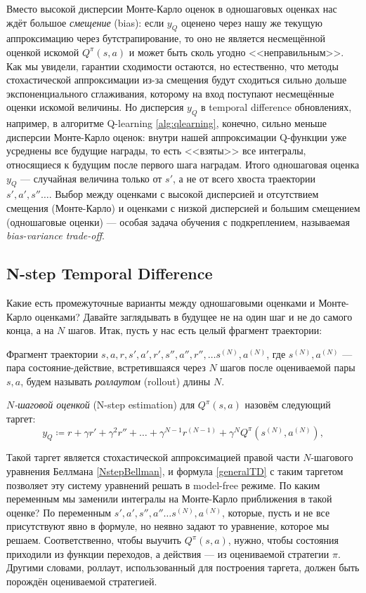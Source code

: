 Вместо высокой дисперсии Монте-Карло оценок в одношаговых оценках нас ждёт большое \emph{смещение} (bias): если $y_Q$ оценено через нашу же текущую аппроксимацию через бутстрапирование, то оно не является несмещённой оценкой искомой $Q^{\pi}(s, a)$ и может быть сколь угодно <<неправильным>>. Как мы увидели, гарантии сходимости остаются, но естественно, что методы стохастической аппроксимации из-за смещения будут сходиться сильно дольше экспоненциального сглаживания, которому на вход поступают несмещённые оценки искомой величины. Но дисперсия $y_Q$ в temporal difference обновлениях, например, в алгоритме Q-learning \ref{alg:qlearning}, конечно, сильно меньше дисперсии Монте-Карло оценок: внутри нашей аппроксимации Q-функции уже усреднены все будущие награды, то есть <<взяты>> все интегралы, относящиеся к будущим после первого шага наградам. Итого одношаговая оценка $y_Q$ --- случайная величина только от $s'$, а не от всего хвоста траектории $s', a', s'' \dots$. Выбор между оценками с высокой дисперсией и отсутствием смещения (Монте-Карло) и оценками с низкой дисперсией и большим смещением (одношаговые оценки) --- особая задача обучения с подкреплением, называемая \emph{bias-variance trade-off}.

\subsection{N-step Temporal Difference}

Какие есть промежуточные варианты между одношаговыми оценками и Монте-Карло оценками? Давайте заглядывать в будущее не на один шаг и не до самого конца, а на $N$ шагов. Итак, пусть у нас есть целый фрагмент траектории:

\begin{definition}
Фрагмент траектории $s, a, r, s', a', r', s'', a'', r'', \dots s^{(N)}, a^{(N)}$, где $s^{(N)}, a^{(N)}$  --- пара состояние-действие, встретившаяся через $N$ шагов после оцениваемой пары $s, a$, будем называть \emph{роллаутом} (rollout) длины $N$.
\end{definition}

\begin{definition}
\emph{$N$-шаговой оценкой} (N-step estimation) для $Q^{\pi}(s, a)$ назовём следующий таргет:
$$y_Q \coloneqq r + \gamma r' + \gamma^2 r'' + \dots + \gamma^{N-1} r^{(N-1)} + \gamma^N Q^{\pi}(s^{(N)}, a^{(N)}),$$
\end{definition}

Такой таргет является стохастической аппроксимацией правой части $N$-шагового уравнения Беллмана \eqref{NstepBellman}, и формула \eqref{generalTD} с таким таргетом позволяет эту систему уравнений решать в model-free режиме. По каким переменным мы заменили интегралы на Монте-Карло приближения в такой оценке? По переменным $s', a', s'', a'' \dots s^{(N)}, a^{(N)}$, которые, пусть и не все присутствуют явно в формуле, но неявно задают то уравнение, которое мы решаем. Соответственно, чтобы выучить $Q^{\pi}(s, a)$, нужно, чтобы состояния приходили из функции переходов, а действия --- из оцениваемой стратегии $\pi$. Другими словами, роллаут, использованный для построения таргета, должен быть порождён оцениваемой стратегией.

